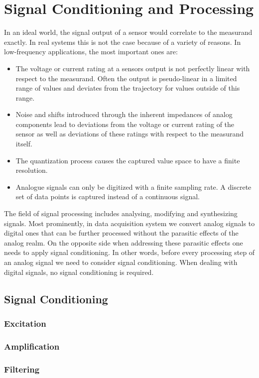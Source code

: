 \chapter{Signal Conditioning and Processing}
\label{chap:\currfilebase}

In an ideal world, the signal output of a sensor would correlate to the measurand exactly. In real systems this is not the case because of a variety of reasons. In low-frequency applications, the most important ones are:

\begin{itemize}
    \item The voltage or current rating at a sensors output is not perfectly linear with respect to the measurand. Often the output is pseudo-linear in a limited range of values and deviates from the trajectory for values outside of this range.
    \item Noise and shifts introduced through the inherent impedances of analog components lead to deviations from the voltage or current rating of the sensor as well as deviations of these ratings with respect to the measurand itself.
    \item The quantization process causes the captured value space to have a finite resolution.
    \item Analogue signals can only be digitized with a finite sampling rate. A discrete set of data points is captured instead of a continuous signal.
\end{itemize}

The field of signal processing includes analysing, modifying and synthesizing signals. Most prominently, in data acquisition system we convert analog signals to digital ones that can be further processed without the parasitic effects of the analog realm. On the opposite side when addressing these parasitic effects one needs to apply signal conditioning. In other words, before every processing step of an analog signal we need to consider signal conditioning. When dealing with digital signals, no signal conditioning is required.

\section{Signal Conditioning}


\subsection{Excitation}

\subsection{Amplification}

\subsection{Filtering}